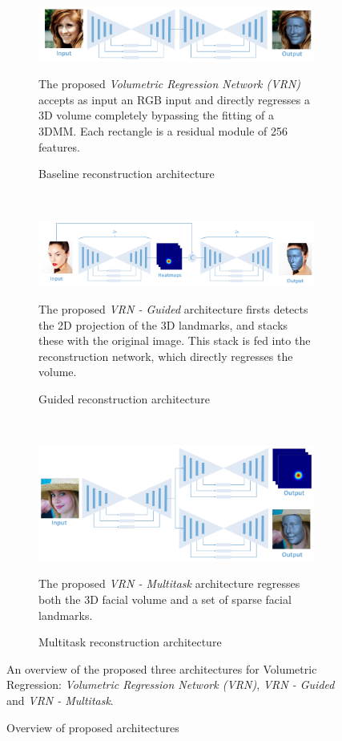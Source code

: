 \begin{figure}
  \centering
  \begin{subfigure}[t]{1\textwidth}
  \centering
  \includegraphics[width=0.81\linewidth]{img/baseline.pdf}
  \caption{Baseline reconstruction architecture}{The proposed
    \textit{Volumetric Regression Network (VRN)} accepts as input an
    RGB input and directly regresses a 3D volume completely bypassing
    the fitting of a 3DMM. Each rectangle is a residual module of 256
    features.}

  \label{fig:cnnbaseline}
  \end{subfigure}
  ~
   \begin{subfigure}[t]{0.98\textwidth}
     \centering
  \includegraphics[width=\linewidth]{img/guided.pdf}
  \caption{Guided reconstruction architecture}{The proposed
    \textit{VRN - Guided} architecture firsts detects the 2D
    projection of the 3D landmarks, and stacks these with the original
    image. This stack is fed into the reconstruction network, which
    directly regresses the volume.}
  \label{fig:guidednet}
   \end{subfigure}
   ~
   \begin{subfigure}[t]{1\textwidth}
   \centering
  \includegraphics[width=0.6\linewidth]{img/multitask.pdf}
  \caption{Multitask reconstruction architecture}{The proposed
    \textit{VRN - Multitask} architecture regresses both the 3D facial
    volume and a set of sparse facial landmarks.}
  \label{fig:cnnmultitask}
  \vspace{-2mm}
  \end{subfigure}
  \caption{Overview of proposed architectures}{An overview of the
    proposed three architectures for Volumetric Regression:
    \textit{Volumetric Regression Network (VRN)}, \textit{VRN -
      Guided} and \textit{VRN - Multitask}.}
  \label{fig:cnnall}
  \vspace{-5mm}
\end{figure}

